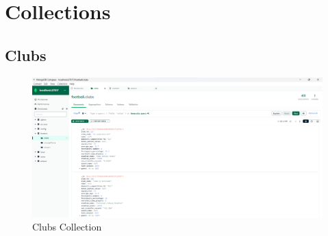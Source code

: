 \documentclass{Configuration_Files/PoliMi3i_thesis}
\begin{document}
\section{Collections}
\subsection{Clubs}
\begin{figure}[htbp]
    \centering
    \includegraphics[scale=0.45]{Images/Dataset/clubs.png}
    \caption{Clubs Collection}
\end{figure}
\end{document}
